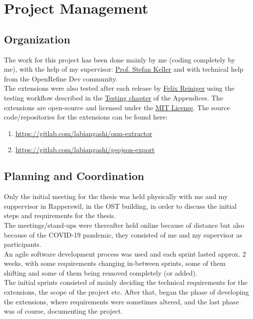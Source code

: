 \chapter{Project Management}
\section{Organization}
The work for this project has been done mainly by me (coding completely by me), with the help of my supervisor: \href{mailto:stefan.keller@ost.ch}{Prof. Stefan Keller}
and with technical help from the OpenRefine Dev community.\\
\newline
The extensions were also tested after each release by \href{mailto:felix.reiniger@ost.ch}{Felix Reiniger} using the testing
workflow described in the \hyperref[sec:test-workflow]{Testing chapter} of the Appendices.
\newline
The extensions are open-source and licensed under the \href{https://mit-license.org/}{MIT License}.
\newline
The source code/repositories for the extensions can be found here:
\begin{enumerate}
    \item \href{https://gitlab.com/labiangashi/osm-extractor}{https://gitlab.com/labiangashi/osm-extractor}
    \item \href{https://gitlab.com/labiangashi/geojson-export}{https://gitlab.com/labiangashi/geojson-export}
\end{enumerate}
\newpage
\section{Planning and Coordination}
Only the initial meeting for the thesis was held physically with me and my suppervisor in Rapperswil,
in the OST building, in order to discuss the initial steps and requirements for the thesis.\\
The meetings/stand-ups were thereafter held online because of distance but also because of the COVID-19 pandemic, they consisted of me and my supervisor as participants.\\
An agile software development process was used and each sprint lasted approx. 2 weeks, with some requirements changing in-between sprints,
some of them shifting and some of them being removed completely (or added). \\
\newline
The initial sprints consisted of mainly deciding the technical requirements for the extensions, the scope of the project etc.
After that, began the phase of developing the extensions, where requirements were sometimes altered, and the last phase was of course, documenting the project.
\pagebreak
